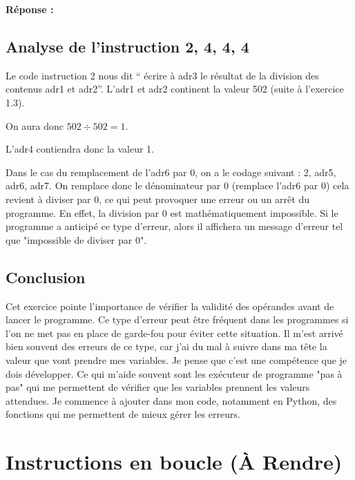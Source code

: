 \begin{graybox}
    \textbf{Réponse :}

    \subsection{Analyse de l'instruction 2, 4, 4, 4}
    Le code instruction 2 nous dit “ écrire à adr3 le résultat de la division des 
    contenus adr1 et adr2”. L’adr1 et adr2 continent la valeur 502 (suite à l’exercice 1.3).

    On aura donc $502 \div 502 = 1$. 
    
    L’adr4 contiendra donc la valeur 1.

    Dans le cas du remplacement de l’adr6 par 0, on a le codage suivant :
    2, adr5, adr6, adr7. On remplace donc le dénominateur par 0 (remplace l’adr6 par 0) 
   cela revient à diviser par 0, ce qui peut provoquer une erreur ou un arrêt du programme. 
   En effet, la division par 0 est mathématiquement impossible. Si le programme a anticipé 
   ce type d'erreur, alors il affichera un message d'erreur tel que "impossible de diviser par 0". 


    \subsection{Conclusion}

    Cet exercice pointe l'importance de vérifier la validité des opérandes avant de lancer
    le programme. Ce type d'erreur peut être fréquent dans les programmes si l'on ne met pas
    en place de garde-fou pour éviter cette situation. Il m'est arrivé bien souvent des erreurs
    de ce type, car j'ai du mal à suivre dans ma tête la valeur que vont prendre mes variables. 
    Je pense que c'est une compétence que je dois développer. Ce qui m'aide souvent sont les 
    exécuteur de programme "pas à pas" qui me permettent de vérifier que les variables prennent
    les valeurs attendues. Je commence à ajouter dans mon code, notamment en Python, des fonctions
    qui me permettent de mieux gérer les erreurs. 

\end{graybox}

\newpage


\setcounter{section}{5}
\section{Instructions en boucle (À Rendre)}

